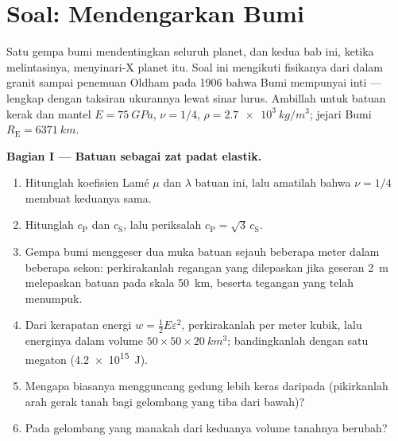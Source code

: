 \section{Soal: Mendengarkan Bumi}

\begin{problem}\label{pb:b3:continuum-elasticity:1}
Satu gempa bumi mendentingkan seluruh planet, dan kedua  bab ini, ketika melintasinya, menyinari-X planet itu. Soal ini
mengikuti fisikanya dari  dalam granit sampai penemuan Oldham
pada 1906 bahwa Bumi mempunyai inti --- lengkap dengan taksiran
ukurannya lewat sinar lurus. Ambillah untuk batuan kerak dan mantel
$E = \qty{75}{GPa}$, $\nu = 1/4$,
$\rho = \qty{2.7e3}{kg/m^3}$; jejari Bumi $R_{\text{E}} =
\qty{6371}{km}$.

\medskip\noindent\textbf{Bagian I --- Batuan sebagai zat padat elastik.}
\begin{enumerate}
  \item Hitunglah koefisien Lamé $\mu$ dan $\lambda$ batuan ini, lalu
        amatilah bahwa $\nu = 1/4$ membuat keduanya sama.
  \item Hitunglah $c_{\text{P}}$ dan $c_{\text{S}}$, lalu periksalah
        $c_{\text{P}} = \sqrt3\,c_{\text{S}}$.
  \item Gempa bumi menggeser dua muka batuan sejauh beberapa meter dalam
        beberapa sekon: perkirakanlah regangan yang dilepaskan jika
        geseran \qty{2}{m} melepaskan batuan pada skala \qty{50}{km},
        beserta tegangan yang telah menumpuk.
  \item Dari kerapatan energi $w = \tfrac12 E\varepsilon^2$,
        perkirakanlah  per meter kubik, lalu energinya
        dalam volume $50 \times 50 \times \qty{20}{km^3}$; bandingkanlah
        dengan satu megaton (\qty{4.2e15}{J}).
  \item Mengapa  biasanya mengguncang gedung lebih keras
        daripada  (pikirkanlah arah gerak tanah bagi
        gelombang yang tiba dari bawah)?
  \item Pada gelombang yang manakah dari keduanya volume tanahnya
        berubah?
\end{enumerate}


\end{problem}
